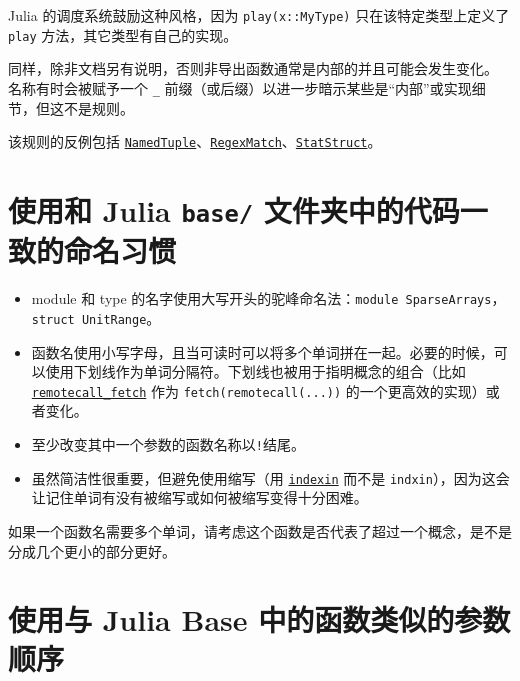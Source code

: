 Julia 的调度系统鼓励这种风格，因为 \texttt{play(x::MyType)} 只在该特定类型上定义了 \texttt{play} 方法，其它类型有自己的实现。



同样，除非文档另有说明，否则非导出函数通常是内部的并且可能会发生变化。 名称有时会被赋予一个 \texttt{\_} 前缀（或后缀）以进一步暗示某些是“内部”或实现细节，但这不是规则。



该规则的反例包括 \hyperlink{3845731488275720657}{\texttt{NamedTuple}}、\hyperlink{2695862412477105800}{\texttt{RegexMatch}}、\hyperlink{10861694406169986183}{\texttt{StatStruct}}。



\hypertarget{17294992054689205687}{}


\section{使用和 Julia \texttt{base/} 文件夹中的代码一致的命名习惯}



\begin{itemize}
\item module 和 type 的名字使用大写开头的驼峰命名法：\texttt{module SparseArrays}，\texttt{struct UnitRange}。


\item 函数名使用小写字母，且当可读时可以将多个单词拼在一起。必要的时候，可以使用下划线作为单词分隔符。下划线也被用于指明概念的组合（比如 \hyperlink{17262349333771600150}{\texttt{remotecall\_fetch}} 作为 \texttt{fetch(remotecall(...))} 的一个更高效的实现）或者变化。


\item 至少改变其中一个参数的函数名称以\texttt{!}结尾。


\item 虽然简洁性很重要，但避免使用缩写（用 \hyperlink{16333903346703258373}{\texttt{indexin}} 而不是 \texttt{indxin}），因为这会让记住单词有没有被缩写或如何被缩写变得十分困难。

\end{itemize}


如果一个函数名需要多个单词，请考虑这个函数是否代表了超过一个概念，是不是分成几个更小的部分更好。



\hypertarget{527161729759687978}{}


\section{使用与 Julia Base 中的函数类似的参数顺序}



